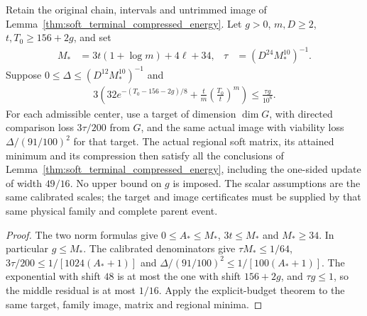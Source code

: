 \begin{lemma}
    \label{thm:calibrated_soft_terminal_compressed_energy}
    \leanok
    Retain the original chain, intervals and untrimmed image of
    Lemma~\ref{thm:soft_terminal_compressed_energy}. Let $g>0$,
    $m,D\ge2$, $t,T_0\ge156+2g$, and set
    \begin{align}
        M_*  & =3t(1+\log m)+4\ell+34, &
        \tau & =(D^{24}M_*^{10})^{-1}.
    \end{align}
    Suppose $0\le\Delta\le(D^{12}M_*^{10})^{-1}$ and
    \begin{align}
        3\left(32e^{-(T_0-156-2g)/8}
        +\frac tm\left(\frac{T_0}t\right)^m\right)
        \le\frac{\tau g}{10^6}.
    \end{align}
    For each admissible center, use a target of dimension $\dim G$,
    with directed comparison loss $3\tau/200$ from $G$, and the same
    actual image with viability loss $\Delta/(91/100)^2$ for that target.
    The actual regional soft matrix, its attained minimum and its
    compression then satisfy all the conclusions of
    Lemma~\ref{thm:soft_terminal_compressed_energy}, including the
    one-sided update of width $49/16$.
    No upper bound on $g$ is imposed. The scalar assumptions are the
    same calibrated scales; the target and image certificates must be
    supplied by that same physical family and complete parent event.
\end{lemma}
\begin{proof}\leanok
    The two norm formulas give $0\le A_*\le M_*$, $3t\le M_*$ and
    $M_*\ge34$. In particular $g\le M_*$. The calibrated denominators
    give $\tau M_*\le1/64$,
    $3\tau/200\le1/[1024(A_*+1)]$ and
    $\Delta/(91/100)^2\le1/[100(A_*+1)]$.
    The exponential with shift $48$ is at most the one with shift
    $156+2g$, and $\tau g\le1$, so the middle residual is at most
    $1/16$. Apply the explicit-budget theorem to the same target,
    family image, matrix and regional minima.
\end{proof}

